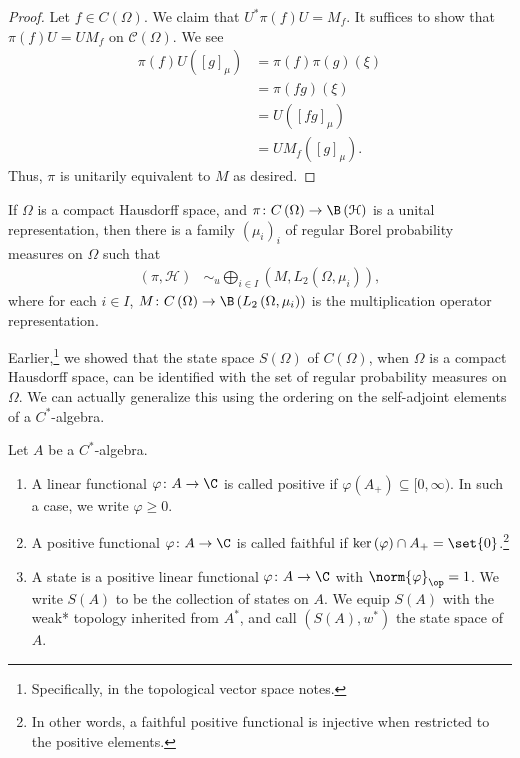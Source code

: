 \documentclass[10pt]{mypackage}
\begin{document}
\begin{proof}
  Let $f\in C\left(\Omega\right)$. We claim that $U^{\ast}\pi(f)U = M_f$. It suffices to show that $\pi(f)U = UM_f$ on $\mathcal{C}\left(\Omega\right)$. We see
  \begin{align*}
    \pi(f)U\left(\left[g\right]_{\mu}\right) &= \pi(f)\pi(g)\left(\xi\right)\\
                                             &= \pi\left(fg\right)\left(\xi\right)\\
                                             &= U\left(\left[fg\right]_{\mu}\right)\\
                                             &= U M_f\left(\left[g\right]_{\mu}\right).
  \end{align*}
  Thus, $\pi$ is unitarily equivalent to $M$ as desired.
\end{proof}
\begin{corollary}
  If $\Omega$ is a compact Hausdorff space, and $\pi\colon C\left(\Omega\right)\rightarrow \B\left(\mathcal{H}\right)$ is a unital representation, then there is a family $\left(\mu_i\right)_i$ of regular Borel probability measures on $\Omega$ such that
  \begin{align*}
    \left(\pi,\mathcal{H}\right) &\sim_{u} \bigoplus_{i\in I}\left(M,L_2\left(\Omega,\mu_i\right)\right),
  \end{align*}
  where for each $i\in I$, $M\colon C\left(\Omega\right)\rightarrow \B\left(L_2\left(\Omega,\mu_i\right)\right)$ is the multiplication operator representation.
\end{corollary}
Earlier,\footnote{Specifically, in the topological vector space notes.} we showed that the state space $S\left(\Omega\right)$ of $C\left(\Omega\right)$, when $\Omega$ is a compact Hausdorff space, can be identified with the set of regular probability measures on $\Omega$. We can actually generalize this using the ordering on the self-adjoint elements of a $C^{\ast}$-algebra.
\begin{definition}
  Let $A$ be a $C^{\ast}$-algebra.
  \begin{enumerate}[(1)]
    \item A linear functional $\varphi\colon A\rightarrow \C$ is called positive if $\varphi\left(A_{+}\right) \subseteq [0,\infty)$. In such a case, we write $\varphi \geq 0$.
    \item A positive functional $\varphi\colon A\rightarrow \C$ is called faithful if $\ker\left(\varphi\right)\cap A_{+} = \set{0}$.\footnote{In other words, a faithful positive functional is injective when restricted to the positive elements.}
    \item A state is a positive linear functional $\varphi\colon A\rightarrow \C$ with $\norm{\varphi}_{\op} = 1$. We write $S(A)$ to be the collection of states on $A$. We equip $S(A)$ with the weak* topology inherited from $A^{\ast}$, and call $\left(S(A),w^{\ast}\right)$ the state space of $A$.
  \end{enumerate}
\end{definition}
\end{document}
